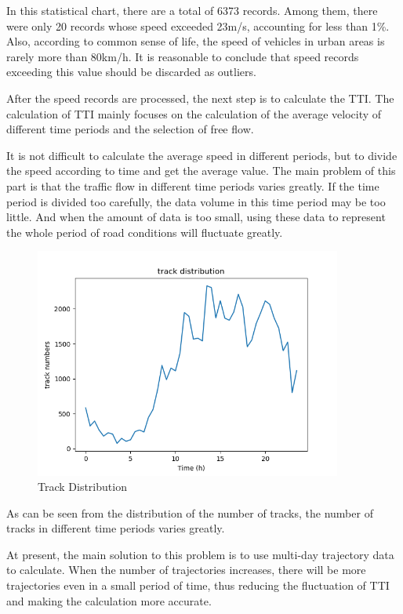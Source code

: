 \documentclass[fontset=none]{ctexart}
\theoremstyle{definition}
\theoremstyle{remark}
\begin{document}
In this statistical chart, there are a total of 6373 records. Among them, there were only 20 records whose speed exceeded 23m/s, accounting for less than 1\%. Also, according to common sense of life, the speed of vehicles in urban areas is rarely more than 80km/h. It is reasonable to conclude that speed records exceeding this value should be discarded as outliers.

After the speed records are processed, the next step is to calculate the TTI. The calculation of TTI mainly focuses on the calculation of the average velocity of different time periods and the selection of free flow.

It is not difficult to calculate the average speed in different periods, but to divide the speed according to time and get the average value. The main problem of this part is that the traffic flow in different time periods varies greatly. If the time period is divided too carefully, the data volume in this time period may be too little. And when the amount of data is too small, using these data to represent the whole period of road conditions will fluctuate greatly.

\begin{figure}[htb]
  \centering
  \includegraphics[width=0.9\textwidth]{images/track_distribution.png}
  \caption{Track Distribution}
  \label{fig: td}
\end{figure}

As can be seen from the distribution of the number of tracks, the number of tracks in different time periods varies greatly.

At present, the main solution to this problem is to use multi-day trajectory data to calculate. When the number of trajectories increases, there will be more trajectories even in a small period of time, thus reducing the fluctuation of TTI and making the calculation more accurate.
\end{document}
